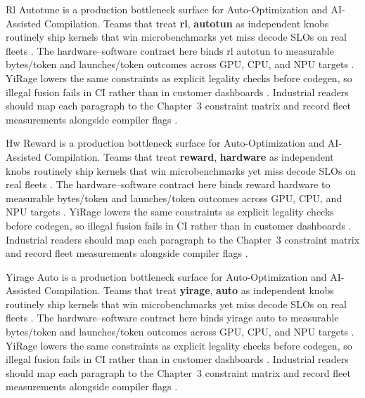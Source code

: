Rl Autotune is a production bottleneck surface for Auto-Optimization and AI-Assisted Compilation. Teams that treat \textbf{rl}, \textbf{autotun} as independent knobs routinely ship kernels that win microbenchmarks yet miss decode SLOs on real fleets \citep{nvidia2024cudagraphs,taxbreak2026}. The hardware--software contract here binds rl autotun to measurable bytes/token and launches/token outcomes across GPU, CPU, and NPU targets \citep{liu2024deepseekv3,memoryfloor2026}. YiRage lowers the same constraints as explicit legality checks before codegen, so illegal fusion fails in CI rather than in customer dashboards \citep{patel2025llminference,nvidia2022hopper}. Industrial readers should map each paragraph to the Chapter~3 constraint matrix and record fleet measurements alongside compiler flags \citep{taxbreak2026,semianalysis2024tma}.

Hw Reward is a production bottleneck surface for Auto-Optimization and AI-Assisted Compilation. Teams that treat \textbf{reward}, \textbf{hardware} as independent knobs routinely ship kernels that win microbenchmarks yet miss decode SLOs on real fleets \citep{liu2024deepseekv3,memoryfloor2026}. The hardware--software contract here binds reward hardware to measurable bytes/token and launches/token outcomes across GPU, CPU, and NPU targets \citep{patel2025llminference,nvidia2022hopper}. YiRage lowers the same constraints as explicit legality checks before codegen, so illegal fusion fails in CI rather than in customer dashboards \citep{taxbreak2026,semianalysis2024tma}. Industrial readers should map each paragraph to the Chapter~3 constraint matrix and record fleet measurements alongside compiler flags \citep{memoryfloor2026,amd2024xdna}.

Yirage Auto is a production bottleneck surface for Auto-Optimization and AI-Assisted Compilation. Teams that treat \textbf{yirage}, \textbf{auto} as independent knobs routinely ship kernels that win microbenchmarks yet miss decode SLOs on real fleets \citep{patel2025llminference,nvidia2022hopper}. The hardware--software contract here binds yirage auto to measurable bytes/token and launches/token outcomes across GPU, CPU, and NPU targets \citep{taxbreak2026,semianalysis2024tma}. YiRage lowers the same constraints as explicit legality checks before codegen, so illegal fusion fails in CI rather than in customer dashboards \citep{memoryfloor2026,amd2024xdna}. Industrial readers should map each paragraph to the Chapter~3 constraint matrix and record fleet measurements alongside compiler flags \citep{nvidia2022hopper,amd2024aie}.

